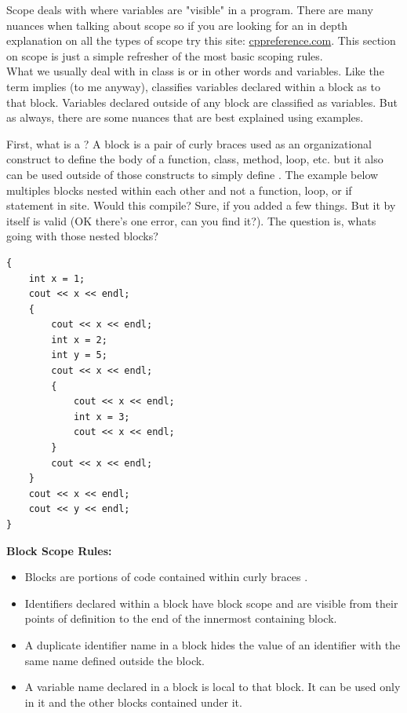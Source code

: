 \newpage
{}


Scope deals with where variables are "visible" in a program. There are many nuances when talking about scope so if you are looking for an in depth explanation on all the types of scope try this site: \href{https://en.cppreference.com/w/cpp/language/scope}{cppreference.com}. This section on scope is just a simple refresher of the most basic scoping rules.\\

What we usually deal with in class is  or in other words  and  variables. Like the term implies (to me anyway),  classifies variables declared within a block as  to that block. Variables declared outside of any block are classified as  variables. But as always, there are some nuances that are best explained using examples.


First, what is a ? A block is a pair of curly braces \btic{\textbf{\{\}}} used as an organizational construct to define the body of a function, class, method, loop, etc. but it also can be used outside of those constructs to simply define . The example below multiples blocks nested within each other and not a function, loop, or if statement in site. Would this compile? Sure, if you added a few things. But it by itself is valid (OK there's one error, can you find it?). The question is, whats going with those nested blocks?

\begin{verbatim}
{
    int x = 1;
    cout << x << endl;            
    {
        cout << x << endl;        
        int x = 2;
        int y = 5;
        cout << x << endl;        
        {
            cout << x << endl;
            int x = 3;
            cout << x << endl;
        }
        cout << x << endl;
    }
    cout << x << endl;
    cout << y << endl;
}
\end{verbatim}

\textbf{Block Scope Rules:}
\begin{itemize}
    \tightlist
    \item Blocks are portions of code contained within curly braces .
    \item Identifiers declared within a block have block scope and are visible from their points of definition to the end of the innermost containing block.
    \item A duplicate identifier name in a block hides the value of an identifier with the same name defined outside the block.
    \item A variable name declared in a block is local to that block. It can be used only in it and the other blocks contained under it. 
\end{itemize}
  
